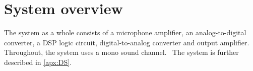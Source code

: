 \section{System overview}
The system as a whole consists of a microphone amplifier, an analog-to-digital converter, a DSP logic circuit, digital-to-analog converter and output amplifier. Throughout, the system uses a mono sound channel. \
The system is further described in  \autoref{apx:DS}.\
